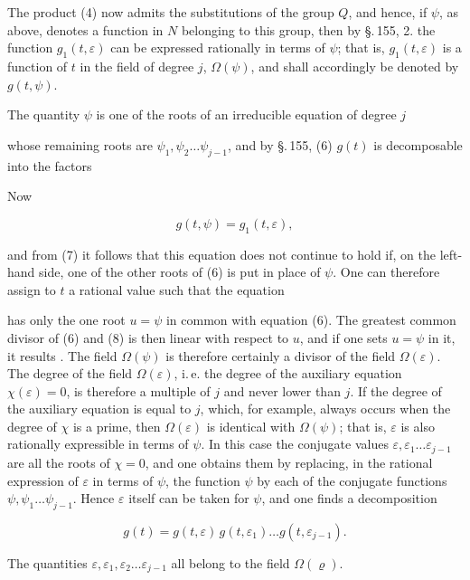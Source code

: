
The product (4) now admits the substitutions of the group $Q$,
and hence, if $\psi$, as above, denotes a function in $N$
belonging to this group, then by \S.\,155, 2. the function
$g_1(t,\varepsilon)$ can be expressed rationally in terms of
$\psi$; that is, $g_1(t,\varepsilon)$ is a function of $t$ in
the field of degree $j$, $\Omega(\psi)$, and shall accordingly
be denoted by $g(t,\psi)$.

The quantity $\psi$ is one of the roots of an irreducible
equation of degree $j$


whose remaining roots are $\psi_1, \psi_2 \dots \psi_{j-1}$,
and by \S.\,155, (6) $g(t)$ is decomposable into the factors


Now

\[ g(t,\psi) = g_1(t,\varepsilon), \]

and from (7) it follows that this equation does not continue to
hold if, on the left-hand side, one of the other roots of (6) is
put in place of $\psi$. One can therefore assign to $t$ a
rational value such that the equation


has only the one root $u = \psi$ in common with equation (6).
The greatest common divisor of (6) and (8) is then linear with
respect to $u$, and if one sets $u = \psi$ in it, it results
. The field $\Omega(\psi)$ is therefore certainly a
divisor of the field $\Omega(\varepsilon)$. The degree of the
field $\Omega(\varepsilon)$, i.\,e. the degree of the auxiliary
equation $\chi(\varepsilon) = 0$, is therefore a multiple of $j$
and never lower than $j$. If the degree of the auxiliary
equation is equal to $j$, which, for example, always occurs when
the degree of $\chi$ is a prime, then $\Omega(\varepsilon)$ is
identical with $\Omega(\psi)$; that is, $\varepsilon$ is also
rationally expressible in terms of $\psi$. In this case the
conjugate values $\varepsilon, \varepsilon_1 \dots
\varepsilon_{j-1}$ are all the roots of $\chi = 0$, and one
obtains them by replacing, in the rational expression of
$\varepsilon$ in terms of $\psi$, the function $\psi$ by each of
the conjugate functions $\psi, \psi_1 \dots \psi_{j-1}$. Hence
$\varepsilon$ itself can be taken for $\psi$, and one finds a
decomposition

\[ g(t) = g(t,\varepsilon)\, g(t,\varepsilon_1) \dots g(t,\varepsilon_{j-1}). \]

The quantities $\varepsilon, \varepsilon_1, \varepsilon_2 \dots
\varepsilon_{j-1}$ all belong to the field $\Omega(\varrho)$.
